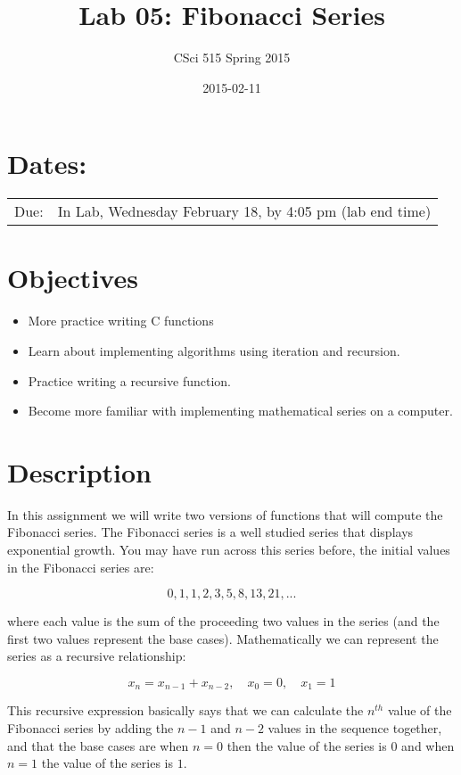 \documentclass[11pt]{article}
\title{Lab 05: Fibonacci Series}
\author{CSci 515 Spring 2015}
\date{2015-02-11}
\begin{document}
\maketitle


\section*{Dates:}
\label{sec-1}


\begin{center}
\begin{tabular}{ll}
 Due:  &  In Lab, Wednesday February 18, by 4:05 pm (lab end time)  \\
\end{tabular}
\end{center}
\section*{Objectives}
\label{sec-2}

\begin{itemize}
\item More practice writing C functions
\item Learn about implementing algorithms using iteration and recursion.
\item Practice writing a recursive function.
\item Become more familiar with implementing mathematical series on a computer.
\end{itemize}
\section*{Description}
\label{sec-3}

In this assignment we will write two versions of functions that will
compute the Fibonacci series.  The Fibonacci series is a well studied
series that displays exponential growth.  You may have run across this
series before, the initial values in the Fibonacci series are:

$$
0, 1, 1, 2, 3, 5, 8, 13, 21, ...
$$

where each value is the sum of the proceeding two values in the series
(and the first two values represent the base cases).  Mathematically
we can represent the series as a recursive relationship:

$$
x_n = x_{n-1} + x_{n-2}, \quad x_0 = 0, \quad x_1 = 1
$$

This recursive expression basically says that we can calculate the
$n^{th}$ value of the Fibonacci series by adding the $n-1$ and $n-2$
values in the sequence together, and that the base cases are when $n=0$
then the value of the series is $0$ and when $n=1$ the value of the
series is $1$.
\end{document}

